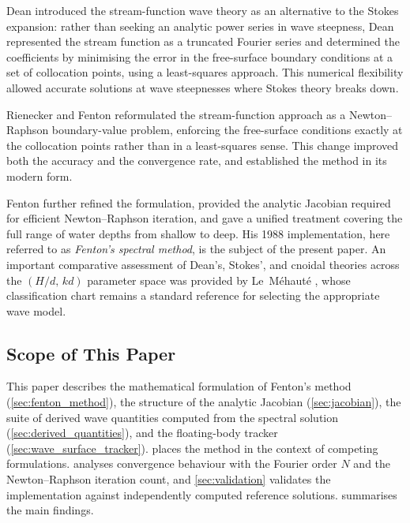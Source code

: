 \documentclass[journal,10pt,twocolumn]{IEEEtran}
\begin{document}
Dean \cite{Dean1965} introduced the stream-function wave theory as an
alternative to the Stokes expansion: rather than seeking an analytic
power series in wave steepness, Dean represented the stream function
as a truncated Fourier series and determined the coefficients by
minimising the error in the free-surface boundary conditions at a set
of collocation points, using a least-squares approach.
This numerical flexibility allowed accurate solutions at wave
steepnesses where Stokes theory breaks down.

Rienecker and Fenton \cite{RieneckerFenton1981} reformulated the
stream-function approach as a Newton--Raphson boundary-value problem,
enforcing the free-surface conditions exactly at the collocation
points rather than in a least-squares sense.
This change improved both the accuracy and the convergence rate, and
established the method in its modern form.

Fenton \cite{Fenton1988} further refined the formulation, provided
the analytic Jacobian required for efficient Newton--Raphson
iteration, and gave a unified treatment covering the full range of
water depths from shallow to deep.
His 1988 implementation, here referred to as \emph{Fenton's spectral
method}, is the subject of the present paper.
An important comparative assessment of Dean's, Stokes', and cnoidal
theories across the $(H/d,\,kd)$ parameter space was provided by
Le~M\'ehaut\'e \cite{LeMehaute1976}, whose classification chart
remains a standard reference for selecting the appropriate wave model.

\subsection{Scope of This Paper}

This paper describes the mathematical formulation of Fenton's method
(\cref{sec:fenton_method}), the structure of the analytic Jacobian
(\cref{sec:jacobian}), the suite of derived wave quantities computed
from the spectral solution (\cref{sec:derived_quantities}), and the
floating-body tracker (\cref{sec:wave_surface_tracker}).
 places the method in the context of competing
formulations.
 analyses convergence behaviour with the Fourier
order $N$ and the Newton--Raphson iteration count, and
\cref{sec:validation} validates the implementation against
independently computed reference solutions.
 summarises the main findings.

\end{document}
